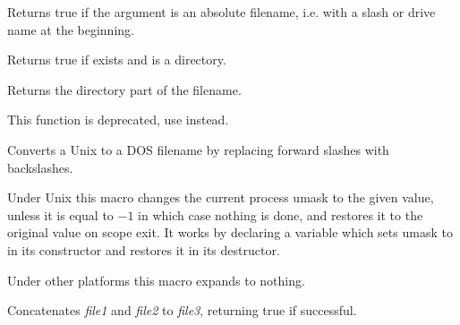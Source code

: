 \label{wxisabsolutepath}


Returns true if the argument is an absolute filename, i.e. with a slash
or drive name at the beginning.


\label{functionwxdirexists}


Returns true if  exists and is a directory.


\label{wxpathonly}


Returns the directory part of the filename.


\label{wxunix2dosfilename}


This function is deprecated, use  instead.

Converts a Unix to a DOS filename by replacing forward
slashes with backslashes.


\label{wxchangeumask}


Under Unix this macro changes the current process umask to the given value,
unless it is equal to $-1$ in which case nothing is done, and restores it to
the original value on scope exit. It works by declaring a variable which sets
umask to  in its constructor and restores it in its destructor.

Under other platforms this macro expands to nothing.


\label{wxconcatfiles}


Concatenates {\it file1} and {\it file2} to {\it file3}, returning
true if successful.


\label{wxcopyfile}


